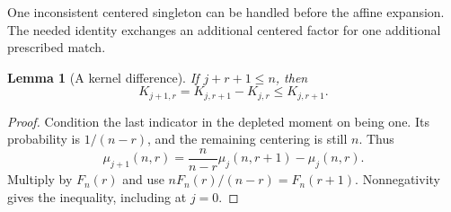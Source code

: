 \documentclass[11pt]{article}
\newtheorem{lemma}[theorem]{Lemma}
\theoremstyle{definition}
\theoremstyle{remark}
\newcommand{\1}{\mathbf 1}
\begin{document}
One inconsistent centered singleton can be handled before the affine expansion. The needed identity exchanges an additional centered factor for one additional prescribed match.

\begin{lemma}[A kernel difference]\label{lem:kerneldifference}
If $j+r+1\le n$, then
\[
K_{j+1,r}=K_{j,r+1}-K_{j,r}\le K_{j,r+1}.
\]
\end{lemma}
\begin{proof}
Condition the last indicator in the depleted moment on being one. Its probability is $1/(n-r)$, and the remaining centering is still $n$. Thus
\[
\mu_{j+1}(n,r)=\frac n{n-r}\mu_j(n,r+1)-\mu_j(n,r).
\]
Multiply by $F_n(r)$ and use $nF_n(r)/(n-r)=F_n(r+1)$. Nonnegativity gives the inequality, including at $j=0$.
\end{proof}
\end{document}
